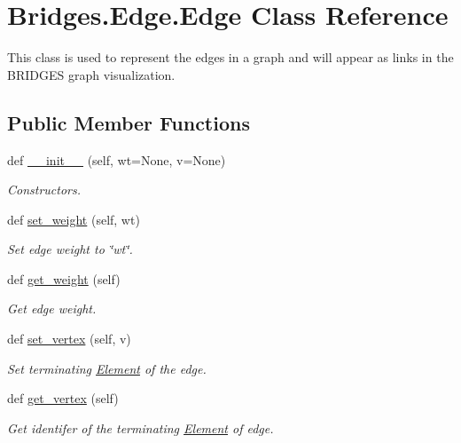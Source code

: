 \hypertarget{class_bridges_1_1_edge_1_1_edge}{}\section{Bridges.\+Edge.\+Edge Class Reference}
\label{class_bridges_1_1_edge_1_1_edge}


This class is used to represent the edges in a graph and will appear as links in the B\+R\+I\+D\+G\+ES graph visualization.  


\subsection*{Public Member Functions}
\begin{DoxyCompactItemize}
\item 
def \mbox{\hyperlink{class_bridges_1_1_edge_1_1_edge_a52aedc015b8b0b4d4ac55a74c0c7e217}{\+\_\+\+\_\+init\+\_\+\+\_\+}} (self, wt=None, v=None)
\begin{DoxyCompactList}\small\item\em Constructors. \end{DoxyCompactList}\item 
def \mbox{\hyperlink{class_bridges_1_1_edge_1_1_edge_ac56a88d2be2c306f4b92e35923610d88}{set\+\_\+weight}} (self, wt)
\begin{DoxyCompactList}\small\item\em Set edge weight to \char`\"{}wt\char`\"{}. \end{DoxyCompactList}\item 
def \mbox{\hyperlink{class_bridges_1_1_edge_1_1_edge_ae1279ba60e0fa7312c1185a3cbfe8a39}{get\+\_\+weight}} (self)
\begin{DoxyCompactList}\small\item\em Get edge weight. \end{DoxyCompactList}\item 
def \mbox{\hyperlink{class_bridges_1_1_edge_1_1_edge_a2f96320e42e68653ead6ea4ef85a77ac}{set\+\_\+vertex}} (self, v)
\begin{DoxyCompactList}\small\item\em Set terminating \mbox{\hyperlink{namespace_bridges_1_1_element}{Element}} of the edge. \end{DoxyCompactList}\item 
def \mbox{\hyperlink{class_bridges_1_1_edge_1_1_edge_a18be7a83a15e5d9d0f49cb8226dddde0}{get\+\_\+vertex}} (self)
\begin{DoxyCompactList}\small\item\em Get identifer of the terminating \mbox{\hyperlink{namespace_bridges_1_1_element}{Element}} of edge. \end{DoxyCompactList}\item 

\end{DoxyCompactItemize}
